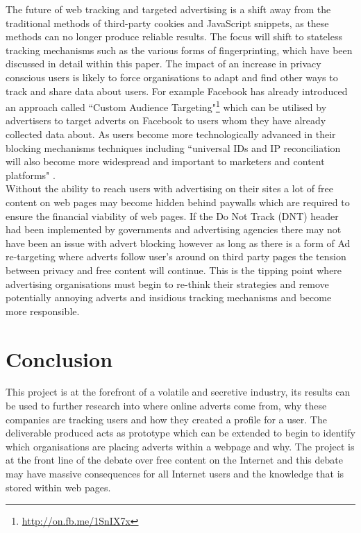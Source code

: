 \documentclass[12pt]{article}
\begin{document}
The future of web tracking and targeted advertising is a shift away from the traditional methods of third-party cookies and JavaScript snippets, as these methods can no longer produce reliable results. The focus will shift to stateless tracking mechanisms such as the various forms of fingerprinting, which have been discussed in detail within this paper. The impact of an increase in privacy conscious users is likely to force organisations to adapt and find other ways to track and share data about users. For example Facebook has already introduced an approach called ``Custom Audience  Targeting"\footnote{\url{ http://on.fb.me/1SnIX7x}} which can be utilised by advertisers to target adverts on Facebook to users whom they have already collected data about. As users become more technologically advanced in their blocking mechanisms techniques including ``universal IDs and IP reconciliation will also become more widespread and important to marketers and content platforms" \parencite{tippingPoint}. \\

Without the ability to reach users with advertising on their sites a lot of free content on web pages may become hidden behind paywalls which are required to ensure the financial viability of web pages. If the Do Not Track (DNT) header had been implemented by governments  and advertising agencies there may not have been an issue with advert blocking however as long as there is a form of Ad re-targeting where adverts follow user's around on third party pages the tension between privacy and free content will continue. This is the tipping point where advertising organisations must begin to re-think their strategies and remove potentially annoying adverts and insidious tracking mechanisms and become more responsible. 

\pagebreak

\section{Conclusion} \label{conclusion}
This project is at the forefront of a volatile and secretive industry, its results can be used to further research into where online adverts come from, why these companies are tracking users and how they created a profile for a user. The deliverable produced acts as prototype which can be extended to begin to identify which organisations are placing adverts within a webpage and why. The project is at the front line of the debate over free content on the Internet and this debate may have massive consequences for all Internet users and the knowledge that is stored within web pages. \\
\end{document}
